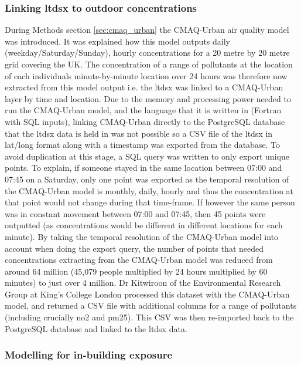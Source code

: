         \subsubsection{Linking \gls{ltdsx} to outdoor concentrations}
        \label{sec:linking_ltdsx_to_cmaq}

During Methods section \ref{sec:cmaq_urban} the CMAQ-Urban air quality model was introduced. It was explained how this model outputs daily (weekday/Saturday/Sunday), hourly concentrations for a 20 metre by 20 metre grid covering the UK. The concentration of a range of pollutants at the location of each individuals minute-by-minute location over 24 hours was therefore now extracted from this model output i.e. the \gls{ltdsx} was linked to a CMAQ-Urban layer by time and location. Due to the memory and processing power needed to run the CMAQ-Urban model, and the language that it is written in (Fortran with SQL inputs), linking CMAQ-Urban directly to the PostgreSQL database that the \gls{ltdsx} data is held in was not possible so a CSV file of the \gls{ltdsx} in lat/long format along with a timestamp was exported from the database. To avoid duplication at this stage, a SQL query was written to only export unique points. To explain, if someone stayed in the same location between 07:00 and 07:45 on a Saturday, only one point was exported as the temporal resolution of the CMAQ-Urban model is monthly, daily, hourly and thus the concentration at that point would not change during that time-frame. If however the same person was in constant movement between 07:00 and 07:45, then 45 points were outputted (as concentrations would be different in different locations for each minute). By taking the temporal resolution of the CMAQ-Urban model into account when doing the export query, the number of points that needed concentrations extracting from the CMAQ-Urban model was reduced from around 64 million (45,079 people multiplied by 24 hours multiplied by 60 minutes) to just over 4 million. Dr Kitwiroon of the Environmental Research Group at King's College London processed this dataset with the CMAQ-Urban model, and returned a CSV file with additional columns for a range of pollutants (including crucially \gls{no2} and \gls{pm25}). This CSV was then re-imported back to the PostgreSQL database and linked to the \gls{ltdsx} data.

        \subsubsection{Modelling for in-building exposure}
        \label{sec:modelling_in_building}

